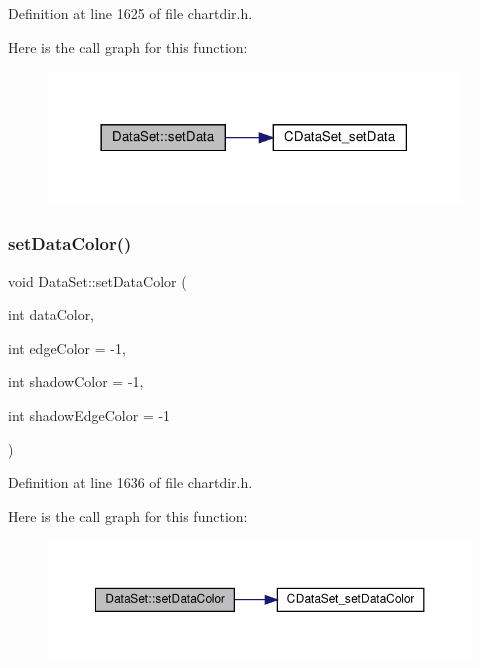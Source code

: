 Definition at line 1625 of file chartdir.\+h.

Here is the call graph for this function\+:
\nopagebreak
\begin{figure}[H]
\begin{center}
\leavevmode
\includegraphics[width=309pt]{class_data_set_a059176a28d82a9524ff8b4687becd719_cgraph}
\end{center}
\end{figure}
\mbox{\label{class_data_set_ab01844c74951ca54d064d3dcafd55310}} 
\subsubsection{\texorpdfstring{set\+Data\+Color()}{setDataColor()}}
{\footnotesize\ttfamily void Data\+Set\+::set\+Data\+Color (\begin{DoxyParamCaption}\item[{int}]{data\+Color,  }\item[{int}]{edge\+Color = {\ttfamily -\/1},  }\item[{int}]{shadow\+Color = {\ttfamily -\/1},  }\item[{int}]{shadow\+Edge\+Color = {\ttfamily -\/1} }\end{DoxyParamCaption})\hspace{0.3cm}{\ttfamily [inline]}}



Definition at line 1636 of file chartdir.\+h.

Here is the call graph for this function\+:
\nopagebreak
\begin{figure}[H]
\begin{center}
\leavevmode
\includegraphics[width=350pt]{class_data_set_ab01844c74951ca54d064d3dcafd55310_cgraph}
\end{center}
\end{figure}
\mbox{\label{class_data_set_a009504918f4973a74b36cb80ee219644}} 
